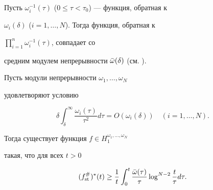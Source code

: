 Пусть $\omega_i^{-1}(\tau)$ ($0\le\tau<\tau_0$) --- функция, обратная к 


$\omega_i(\delta)$ ($i=1,\dotsc,N$). Тогда функция, обратная к 


$\prod\limits^n_{i=1}\omega_i^{-1}(\tau)$, совпадает со 


средним модулем непрерывности $\Bar\omega(\delta)$ (см. \cite{Kol3}). 


 


\begin{thm} Пусть модули непрерывности $\omega_1,\dotsc,\omega_N$ 


удовлетворяют условию 


\begin{equation} 


\delta\int_\delta^\infty\frac{\omega_i(\tau)}{\tau^2}d\tau 


=O(\omega_i(\delta))\quad (i=1,\dotsc,N). 


\end{equation} 


Тогда существует функция $f\in H_1^{\omega_1,\dotsc,\omega_N}$ 


такая, что для всех $t>0$ 


\begin{equation} 


(f_{\st}^\#)^*(t)\ge\frac{1}{t}\int_0^t\frac{\Bar\omega(\tau)}{\tau} 


\log^{N-2}\frac{t}{\tau}d\tau. 


\end{equation} 


\end{thm} 


 


